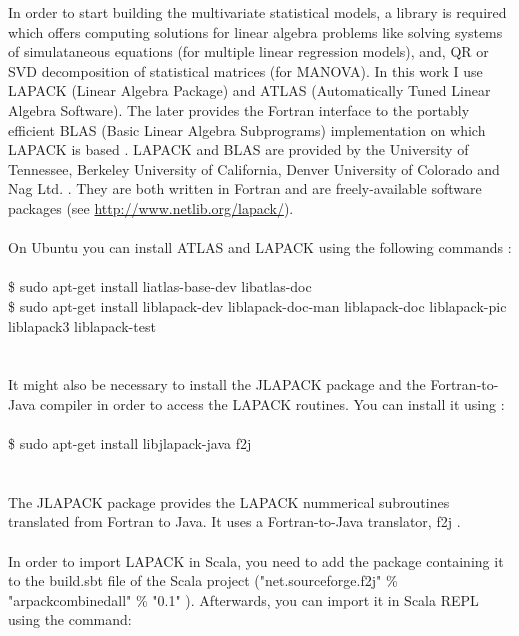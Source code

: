 \documentclass {article}
\begin{document}
In order to start building the multivariate statistical models, a library is required which offers computing solutions for linear algebra problems like solving systems of simulataneous equations (for multiple linear regression models), and, QR or SVD decomposition of statistical matrices (for MANOVA). 
In this work I use LAPACK (Linear Algebra Package) and ATLAS (Automatically Tuned Linear Algebra Software).
 The later provides the Fortran interface to the portably efficient BLAS (Basic Linear Algebra Subprograms) implementation \cite{sourceforge_atlas_2017} on which LAPACK is based \cite{icl_install_2007}.
 LAPACK and BLAS are provided by the University of Tennessee, Berkeley University of California, Denver University of Colorado and Nag Ltd. \cite{icl_lapack_2017} \cite{icl_blas_2017}. 
They are both written in Fortran and are freely-available software packages (see \href{http://www.netlib.org/lapack/}{http://www.netlib.org/lapack/}). 
\\
\\
On Ubuntu you can install ATLAS and LAPACK using the following commands \cite{canonical_lapack_nodate} \cite{canonical_atlas_nodate} \cite{canonical_askubuntu_nodate}:
\\
\\
\$ sudo apt-get install liatlas-base-dev libatlas-doc\\
\$ sudo apt-get install liblapack-dev liblapack-doc-man liblapack-doc liblapack-pic liblapack3 liblapack-test \\
\\
\\
It might also be necessary to install the JLAPACK package and the Fortran-to-Java compiler in order to access the LAPACK routines. You can install it using \cite{canonical_libjlapack_nodate} \cite{canonical_f2j_nodate}:
\\
\\
\$ sudo apt-get install libjlapack-java f2j\\
\\
\\
The JLAPACK package provides the LAPACK nummerical subroutines translated from Fortran to Java. It uses a Fortran-to-Java translator, f2j \cite{doolin_jlapack_1999}.
\\
\\  
In order to import LAPACK in Scala, you need to add the package containing it to the build.sbt file of the Scala project ("net.sourceforge.f2j" \% "arpack\underline{\space}combined\underline{\space}all" \% "0.1" \cite{mvn_repo_2017}).  
Afterwards, you can import it in Scala REPL using the command:
\end{document}

